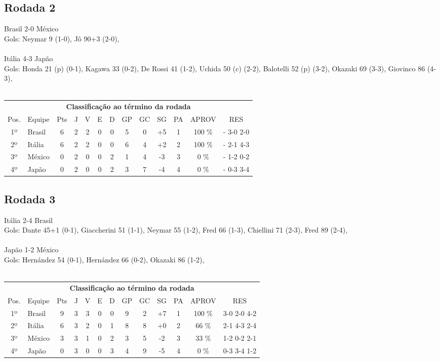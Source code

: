 \documentclass{article}
\begin{document}
\subsection*{Rodada 2}
Brasil 2-0 México\\
Gols: Neymar  9 (1-0), Jô  90+3 (2-0), \\
\\
Itália 4-3 Japão\\
Gols: Honda  21 (p) (0-1), Kagawa  33 (0-2), De Rossi  41 (1-2), Uchida  50 (c) (2-2), Balotelli  52 (p) (3-2), Okazaki  69 (3-3), Giovinco  86 (4-3), \\
\\
\begin{center}
\begin{tabular}{| c | l | c | c | c | c | c | c | c | c | c | c | c |}
\multicolumn{13}{c}{\textbf{Classificação ao término da rodada}}\\
Pos.&Equipe&Pts&J&V&E&D&GP&GC&SG&PA&APROV&RES\\
1º&Brasil              &6&2	&2&0&0	&5&0&+5	&1&100 \%	& - 3-0 2-0 \\
2º&Itália              &6&2	&2&0&0	&6&4&+2	&2&100 \%	& - 2-1 4-3 \\
3º&México              &0&2	&0&0&2	&1&4&-3	&3&  0 \%	& - 1-2 0-2 \\
4º&Japão               &0&2	&0&0&2	&3&7&-4	&4&  0 \%	& - 0-3 3-4 \\
\end{tabular}
\end{center}


\subsection*{Rodada 3}
Itália 2-4 Brasil\\
Gols: Dante  45+1 (0-1), Giaccherini  51 (1-1), Neymar  55 (1-2), Fred  66 (1-3), Chiellini  71 (2-3), Fred  89 (2-4), \\
\\
Japão 1-2 México\\
Gols: Hernández  54 (0-1), Hernández  66 (0-2), Okazaki  86 (1-2), \\
\\
\begin{center}
\begin{tabular}{| c | l | c | c | c | c | c | c | c | c | c | c | c |}
\multicolumn{13}{c}{\textbf{Classificação ao término da rodada}}\\
Pos.&Equipe&Pts&J&V&E&D&GP&GC&SG&PA&APROV&RES\\
1º&Brasil              &9&3	&3&0&0	&9&2&+7	&1&100 \%	&3-0 2-0 4-2 \\
2º&Itália              &6&3	&2&0&1	&8&8&+0	&2& 66 \%	&2-1 4-3 2-4 \\
3º&México              &3&3	&1&0&2	&3&5&-2	&3& 33 \%	&1-2 0-2 2-1 \\
4º&Japão               &0&3	&0&0&3	&4&9&-5	&4&  0 \%	&0-3 3-4 1-2 \\
\end{tabular}
\end{center}
\end{document}
